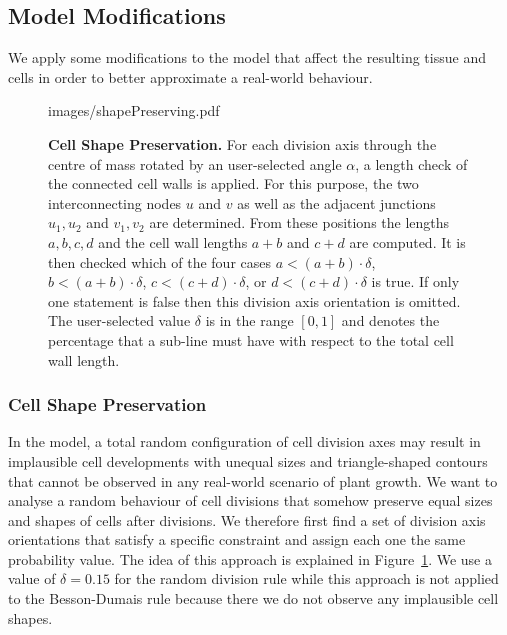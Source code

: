 \documentclass[11pt,a4paper, final]{article}
\begin{document}
\subsection{Model Modifications}
We apply some modifications to the model that affect the resulting tissue and cells in order to better approximate a real-world behaviour.
%
\begin{figure}[htbp]
	\begin{center}
		\begin{overpic}[width=0.7\linewidth]{images/shapePreserving.pdf}
		\end{overpic}
\caption[]
{
{\bf Cell Shape Preservation.} For each division axis through the centre of mass rotated by an user-selected angle $\alpha$, a length check of the connected cell walls is applied. For this purpose, the two interconnecting nodes $u$ and $v$ as well as the adjacent junctions $u_1, u_2$ and $v_1, v_2$ are determined. From these positions the lengths $a, b, c, d$ and the cell wall lengths $a+b$ and $c+d$ are computed. It is then checked which of the four cases $a < (a+b)\cdot \delta$, $b < (a+b)\cdot \delta$, $c < (c+d)\cdot \delta$, or $d < (c+d)\cdot \delta$ is true. If only one statement is false then this division axis orientation is omitted. The user-selected value $\delta$ is in the range $[0,1]$ and denotes the percentage that a sub-line must have with respect to the total cell wall length.
}
	\label{fig:shapePreserving}
	\end{center}
\end{figure}
%
\subsubsection{Cell Shape Preservation}
\label{sec:cellShape}
\noindent
In the model, a total random configuration of cell division axes may result in implausible cell developments with unequal sizes and triangle-shaped contours that cannot be observed in any real-world scenario of plant growth. We want to analyse a random behaviour of cell divisions that somehow preserve equal sizes and shapes of cells after divisions. We therefore first find a set of division axis orientations that satisfy a specific constraint and assign each one the same probability value. The idea of this approach is explained in Figure~\ref{fig:shapePreserving}. We use a value of $\delta = 0.15$ for the random division rule while this approach is not applied to the Besson-Dumais rule because there we do not observe any implausible cell shapes.
\end{document}
